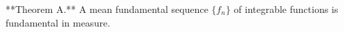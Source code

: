 **Theorem A.** A mean fundamental sequence $\{f_n\}$ of integrable functions is fundamental in measure.
